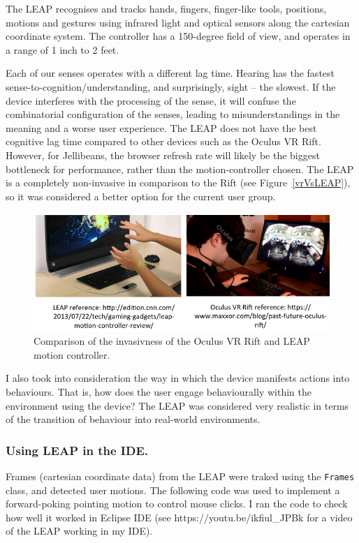 \documentclass[a4paper, 11pt]{article}
\begin{document}
The LEAP recognises and tracks hands, fingers, finger-like tools, positions, motions and gestures using infrared light and optical sensors along the cartesian coordinate system. The controller has a 150-degree field of view, and operates in a range of 1 inch to 2 feet.  

\vspace{5mm}
Each of our senses operates with a different lag time. Hearing has the fastest sense-to-cognition/understanding, and surprisingly, sight -- the slowest. If the device interferes with the processing of the sense, it will confuse the combinatorial configuration of the senses, leading to misunderstandings in the meaning and a worse user experience. The LEAP does not have the best cognitive lag time compared to other devices such as the Oculus VR Rift. However, for Jellibeans, the browser refresh rate will likely be the biggest bottleneck for performance, rather than the motion-controller chosen. The LEAP is a completely non-invasive in comparison to the Rift (see Figure~\ref{vrVsLEAP}), so it was considered a better option for the current user group.

\begin{figure}[H]
\begin{center}
\includegraphics[scale=0.5]{VRvsLEAP}
\caption{Comparison of the invasivness of the Oculus VR Rift and LEAP motion controller.}
\label{saveScores}
\end{center}
\end{figure}

I also took into consideration the way in which the device manifests actions into behaviours. That is, how does the user engage behaviourally within the environment using the device? The LEAP was considered very realistic in terms of the transition of behaviour into real-world environments.

\subsubsection{Using LEAP in the IDE.}
Frames (cartesian coordinate data) from the LEAP were traked using the \texttt{Frames} class, and detected user motions. The following code was used to implement a forward-poking pointing motion to control mouse clicks. I ran the code to check how well it worked in Eclipse IDE (see https://youtu.be/ikfiul\_JPBk for a video of the LEAP working in my IDE). 
\end{document}

